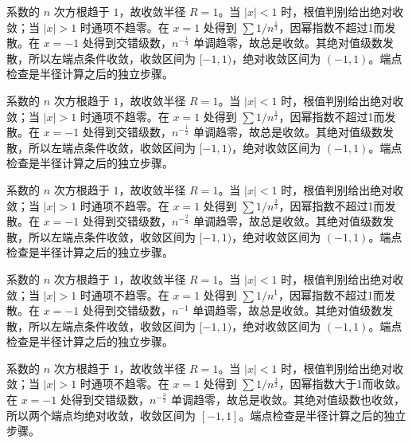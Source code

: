 \documentclass[12pt,fontset=fandol]{ctexart}
\begin{document}
\begin{solve}\label{ans:c26q2}
系数的 $n$ 次方根趋于 $1$，故收敛半径 $R=1$。当 $|x|<1$ 时，根值判别给出绝对收敛；当 $|x|>1$ 时通项不趋零。在 $x=1$ 处得到 $\sum1/n^{\frac{1}{3}}$，因幂指数不超过1而发散。在 $x=-1$ 处得到交错级数，$n^{-\frac{1}{3}}$ 单调趋零，故总是收敛。其绝对值级数发散，所以左端点条件收敛，收敛区间为 $[-1,1)$，绝对收敛区间为 $(-1,1)$。端点检查是半径计算之后的独立步骤。
\end{solve}

\begin{solve}\label{ans:c26q3}
系数的 $n$ 次方根趋于 $1$，故收敛半径 $R=1$。当 $|x|<1$ 时，根值判别给出绝对收敛；当 $|x|>1$ 时通项不趋零。在 $x=1$ 处得到 $\sum1/n^{\frac{1}{2}}$，因幂指数不超过1而发散。在 $x=-1$ 处得到交错级数，$n^{-\frac{1}{2}}$ 单调趋零，故总是收敛。其绝对值级数发散，所以左端点条件收敛，收敛区间为 $[-1,1)$，绝对收敛区间为 $(-1,1)$。端点检查是半径计算之后的独立步骤。
\end{solve}

\begin{solve}\label{ans:c26q4}
系数的 $n$ 次方根趋于 $1$，故收敛半径 $R=1$。当 $|x|<1$ 时，根值判别给出绝对收敛；当 $|x|>1$ 时通项不趋零。在 $x=1$ 处得到 $\sum1/n^{\frac{2}{3}}$，因幂指数不超过1而发散。在 $x=-1$ 处得到交错级数，$n^{-\frac{2}{3}}$ 单调趋零，故总是收敛。其绝对值级数发散，所以左端点条件收敛，收敛区间为 $[-1,1)$，绝对收敛区间为 $(-1,1)$。端点检查是半径计算之后的独立步骤。
\end{solve}

\begin{solve}\label{ans:c26q5}
系数的 $n$ 次方根趋于 $1$，故收敛半径 $R=1$。当 $|x|<1$ 时，根值判别给出绝对收敛；当 $|x|>1$ 时通项不趋零。在 $x=1$ 处得到 $\sum1/n^{1}$，因幂指数不超过1而发散。在 $x=-1$ 处得到交错级数，$n^{-1}$ 单调趋零，故总是收敛。其绝对值级数发散，所以左端点条件收敛，收敛区间为 $[-1,1)$，绝对收敛区间为 $(-1,1)$。端点检查是半径计算之后的独立步骤。
\end{solve}

\begin{solve}\label{ans:c26q6}
系数的 $n$ 次方根趋于 $1$，故收敛半径 $R=1$。当 $|x|<1$ 时，根值判别给出绝对收敛；当 $|x|>1$ 时通项不趋零。在 $x=1$ 处得到 $\sum1/n^{\frac{3}{2}}$，因幂指数大于1而收敛。在 $x=-1$ 处得到交错级数，$n^{-\frac{3}{2}}$ 单调趋零，故总是收敛。其绝对值级数也收敛，所以两个端点均绝对收敛，收敛区间为 $[-1,1]$。端点检查是半径计算之后的独立步骤。
\end{solve}
\end{document}
